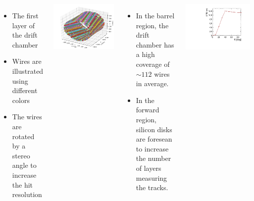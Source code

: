 \documentclass[final,xcolor={dvipsnames,svgnames,x11names,table}]{beamer}
\begin{document}
\begin{frame}
\begin{textblock}{82}
\begin{tcolorbox}[title=The drift chamber]
\begin{columns}
      \begin{columns}
        \begin{itemize}
          \item The first layer of the drift chamber
          \item Wires are illustrated using different colors
          \item The wires are rotated by a stereo angle to increase the hit resolution
        \end{itemize}
        \centering
        \includegraphics[width=\textwidth]{Figures/allHits}

        \begin{itemize}
          \item In the barrel region, the drift chamber has a high coverage of $\sim 112$ wires in average.
          \item In the forward region, silicon disks are foresean to increase the number of layers measuring the tracks.
        \end{itemize}
        \centering
        \includegraphics[width=\textwidth]{Figures/numWires}
        \end{columns}


\end{columns}
\end{tcolorbox}
\end{textblock}
\end{frame}
\end{document}
